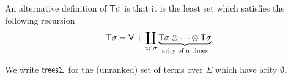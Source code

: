 An alternative definition of $\mathsf T \sigma$ is that it is the least set which satisfies the following recursion
\begin{align*}
    \mathsf T \sigma = \mathsf V + \coprod_{a \in \sigma} \underbrace{\mathsf T \sigma \otimes \cdots \otimes \mathsf T \sigma}_{\text{arity of $a$ times}}
\end{align*}

We write $\mathsf {trees} \Sigma$ for the (unranked) set of terms over $\Sigma$ which have arity $\emptyset$. 
